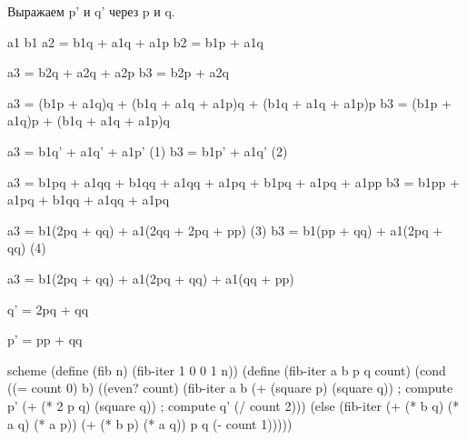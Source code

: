 Выражаем p' и q' через p и q.

\begin{proposition}
a1 b1
a2 = b1q + a1q + a1p
b2 = b1p + a1q


a3 = b2q + a2q + a2p
b3 = b2p + a2q


a3 = (b1p + a1q)q + (b1q + a1q + a1p)q + (b1q + a1q + a1p)p
b3 = (b1p + a1q)p + (b1q + a1q + a1p)q

a3 = b1q' + a1q' + a1p' (1)
b3 = b1p' + a1q' (2)

a3 = b1pq + a1qq + b1qq + a1qq + a1pq + b1pq + a1pq + a1pp
b3 = b1pp + a1pq + b1qq + a1qq + a1pq

a3 = b1(2pq + qq) + a1(2qq + 2pq + pp) (3)
b3 = b1(pp + qq) + a1(2pq + qq) (4)

a3 = b1(2pq + qq) + a1(2pq + qq) + a1(qq + pp)


q' = 2pq + qq

p' = pp + qq
\end{proposition}

\begin{codelisting}{scheme}
(define (fib n)
  (fib-iter 1 0 0 1 n))
(define (fib-iter a b p q count)
  (cond ((= count 0) b)
        ((even? count)
         (fib-iter a
                   b
                   (+ (square p) (square q))      ; compute p'
                   (+ (* 2 p q) (square q))      ; compute q'
                   (/ count 2)))
        (else (fib-iter (+ (* b q) (* a q) (* a p))
                        (+ (* b p) (* a q))
                        p
                        q
                        (- count 1)))))
\end{codelisting}